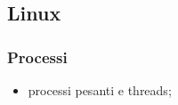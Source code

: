 \documentclass[12pt,a4paper]{article}
\begin{document}
\subsection{Linux}
\subsubsection{Processi}
\begin{itemize}
  \item processi pesanti e threads;
\end{itemize}

\clearpage
\printbibliography[heading=bibintoc]
\end{document}
